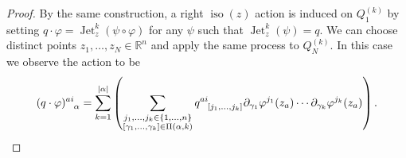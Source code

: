 \documentclass[12pt]{amsart}
\newcommand{\R}{\ensuremath{\mathbb{R}}}
\DeclareMathOperator{\Jet}{Jet}
\DeclareMathOperator{\iso}{iso}
\begin{document}
\begin{proof}
    By the same construction, a right $\iso(z)$ action is induced
    on $Q_1^{(k)}$ by setting $q \cdot \varphi = \Jet^k_z(\psi \circ \varphi)$ for any $\psi$ such that $\Jet^k_z(\psi) = q$.
    We can choose distinct points $z_1,\dots,z_N \in \R^n$
    and apply the same process to $Q_N^{(k)}$.  In this case we observe the action to be
    \begin{align*}
      (q \cdot \varphi)\indices{^{ai}_\alpha} = \sum_{k=1}^{|\alpha|}
      \left(
        \sum_{
        \substack{
          j_1,\dots,j_k \in \{1,\dots,n\} \\
          [\gamma_1,\dots,\gamma_k] \in \Pi(\alpha , k)
          }
          }
          q\indices{^{ai}_{[j_1,\dots,j_k]}}
          \partial_{\gamma_1} \varphi^{j_1}(z_a) \cdots
          \partial_{\gamma_k} \varphi^{j_k}(z_a)
        \right).
    \end{align*}
  \end{proof}
  
\end{document}
